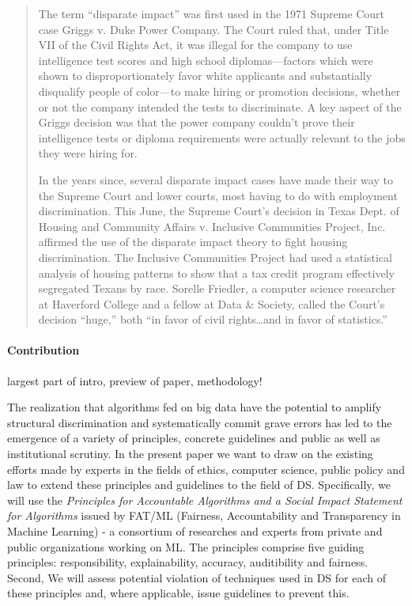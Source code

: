 \documentclass{article}
\begin{document}
\begin{quote}
The term “disparate impact” was first used in the 1971 Supreme Court case Griggs v. Duke Power Company. The Court ruled that, under Title VII of the Civil Rights Act, it was illegal for the company to use intelligence test scores and high school diplomas—factors which were shown to disproportionately favor white applicants and substantially disqualify people of color—to make hiring or promotion decisions, whether or not the company intended the tests to discriminate. A key aspect of the Griggs decision was that the power company couldn’t prove their intelligence tests or diploma requirements were actually relevant to the jobs they were hiring for.

In the years since, several disparate impact cases have made their way to the Supreme Court and lower courts, most having to do with employment discrimination. This June, the Supreme Court’s decision in Texas Dept. of Housing and Community Affairs v. Inclusive Communities Project, Inc. affirmed the use of the disparate impact theory to fight housing discrimination. The Inclusive Communities Project had used a statistical analysis of housing patterns to show that a tax credit program effectively segregated Texans by race. Sorelle Friedler, a computer science 
researcher at Haverford College and a fellow at Data \& Society, called the Court’s decision “huge,” both “in favor of civil rights…and in favor of statistics.”
\end{quote}

\paragraph{Contribution}
largest part of intro, preview of paper, methodology!

The realization that algorithms fed on big data have the potential to amplify structural discrimination and systematically commit grave errors has led to the emergence of a variety of principles, concrete guidelines and public as well as institutional scrutiny.
In the present paper we want to draw on the existing efforts made by experts in the fields of ethics, computer science, public policy and law to extend these principles and guidelines to the field of DS. Specifically, we will use the \emph{Principles for Accountable Algorithms and a Social Impact Statement for Algorithms} issued by FAT/ML (Fairness, Accountability and Transparency in Machine Learning) - a consortium of researches and experts from private and public organizations working on ML. 
The principles comprise five guiding principles: responsibility, explainability, accuracy, auditibility and fairness. %
Second, 
We will assess potential violation of techniques used in DS for each of these principles and, where applicable, issue guidelines to prevent this.
\end{document}
